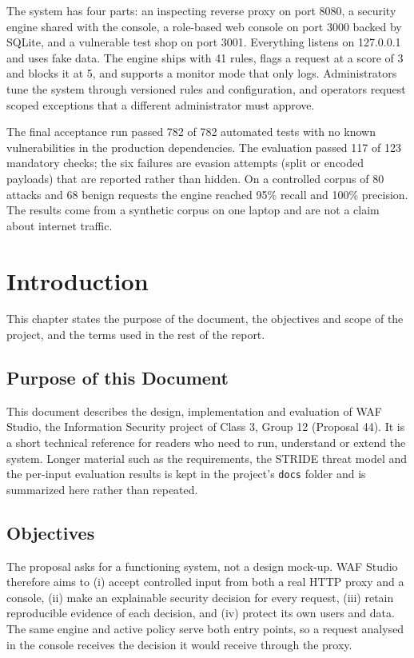 \documentclass{FastFyp}
\begin{document}
The system has four parts: an inspecting reverse proxy on port 8080, a security engine shared with the console, a role-based web console on port 3000 backed by SQLite, and a vulnerable test shop on port 3001. Everything listens on 127.0.0.1 and uses fake data. The engine ships with 41 rules, flags a request at a score of 3 and blocks it at 5, and supports a monitor mode that only logs. Administrators tune the system through versioned rules and configuration, and operators request scoped exceptions that a different administrator must approve.

The final acceptance run passed 782 of 782 automated tests with no known vulnerabilities in the production dependencies. The evaluation passed 117 of 123 mandatory checks; the six failures are evasion attempts (split or encoded payloads) that are reported rather than hidden. On a controlled corpus of 80 attacks and 68 benign requests the engine reached 95\% recall and 100\% precision. The results come from a synthetic corpus on one laptop and are not a claim about internet traffic.

\pagestyle{fancy}
\pagebreak
\tableofcontents

\pagebreak
\listoffigures
{}
\pagebreak
\listoftables
{}

\mainmatter

\chapter{Introduction}
This chapter states the purpose of the document, the objectives and scope of the project, and the terms used in the rest of the report.

\section{Purpose of this Document}
This document describes the design, implementation and evaluation of WAF Studio, the Information Security project of Class 3, Group 12 (Proposal 44). It is a short technical reference for readers who need to run, understand or extend the system. Longer material such as the requirements, the STRIDE threat model and the per-input evaluation results is kept in the project's \texttt{docs} folder and is summarized here rather than repeated.

\section{Objectives}
The proposal asks for a functioning system, not a design mock-up. WAF Studio therefore aims to (i) accept controlled input from both a real HTTP proxy and a console, (ii) make an explainable security decision for every request, (iii) retain reproducible evidence of each decision, and (iv) protect its own users and data. The same engine and active policy serve both entry points, so a request analysed in the console receives the decision it would receive through the proxy.
\end{document}
